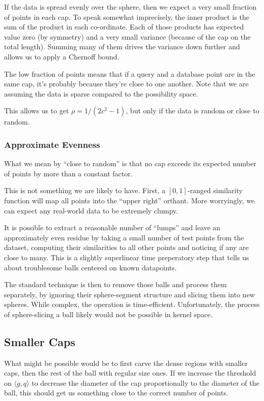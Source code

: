 \documentclass[twoside,11pt]{homework}
\begin{document}
\begin{multicols}{2}
If the data is spread evenly over the sphere, then we expect a very
small fraction of points in each cap.  To speak somewhat imprecisely,
the inner product is the sum of the product in each co-ordinate.  Each
of those products has expected value zero (by symmetry) and a very
small variance (because of the cap on the total length).  Summing many
of them drives the variance down further and allows us to apply a
Chernoff bound.

The low fraction of points means that if a query and a database point
are in the same cap, it's probably because they're close to one
another.  Note that we are assuming the data is sparse compared to
the possibility space.

This allows us to get $\rho=1/(2c^2-1)$, but only if the data is
random or close to random.

\subsubsection{Approximate Evenness}

What we mean by ``close to random'' is that no cap exceeds its
expected number of points by more than a constant factor.

This is not something we are likely to have.  First, a $[0,1]$-ranged
similarity function will map all points into the ``upper right''
orthant.  More worryingly, we can expect any real-world data to be
extremely clumpy.

It is possible to extract a reasonable number of ``lumps'' and leave
an approximately even residue by taking a small number of test points
from the dataset, computing their similarities to all other points and
noticing if any are close to many.  This is a slightly superlinear
time preperatory step that tells us about troublesome balls centered
on known datapoints.

The standard technique is then to remove those balls and process them
separately, by ignoring their sphere-segment structure and slicing
them into new spheres.  While complex, the operation is
time-efficient.  Unfortunately, the process of sphere-slicing a ball
likely would not be possible in kernel space.

\subsection{Smaller Caps}

What might be possible would be to first carve the dense regions with
smaller caps, then the rest of the ball with regular size ones.  If we
increase the threshold on $\langle g,q \rangle$ to decrease the
diameter of the cap proportionally to the diameter of the ball, this
should get us something close to the correct number of points.  


\end{multicols}
\end{document}
